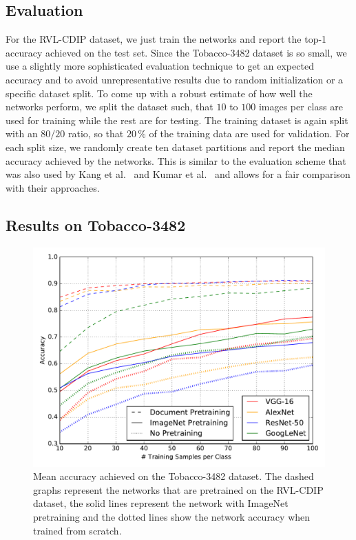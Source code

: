 \subsection{Evaluation}

For the RVL-CDIP dataset, we just train the networks and report the top-1 accuracy achieved on the test set. Since the Tobacco-3482 dataset is so small, we use a slightly more sophisticated evaluation technique to get an expected accuracy and to avoid unrepresentative results due to random initialization or a specific dataset split. To come up with a robust estimate of how well the networks perform, we split the dataset such, that $10$ to $100$ images per class are used for training while the rest are for testing. The training dataset is again split with an $80/20$ ratio, so that $20\,\%$ of the training data are used for validation. For each split size, we randomly create ten dataset partitions and report the median accuracy achieved by the networks.
This is similar to the evaluation scheme that was also used by Kang et al.~\cite{lekang_14_a} and Kumar et al.~\cite{doclass_Kumar14} and allows for a fair comparison with their approaches.


\subsection{Results on Tobacco-3482}

\begin{figure}
        \centering
        \includegraphics[width=\linewidth]{accuracy_compare.pdf}
        \caption{Mean accuracy achieved on the Tobacco-3482 dataset. The dashed graphs represent the networks that are pretrained on the RVL-CDIP dataset, the solid lines represent the network with ImageNet pretraining and the dotted lines show the network accuracy when trained from scratch.}
\label{fig:accuracy}
\end{figure}



